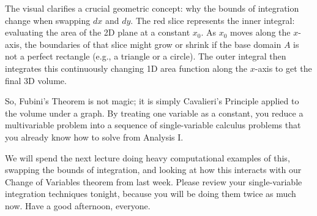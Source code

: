 \begin{math-stroke}
\begin{center}
\end{center}

\begin{explanation-of-steps}
The visual clarifies a crucial geometric concept: why the bounds of integration change when swapping $dx$ and $dy$. The red slice represents the inner integral: evaluating the area of the 2D plane at a constant $x_0$. As $x_0$ moves along the $x$-axis, the boundaries of that slice might grow or shrink if the base domain $A$ is not a perfect rectangle (e.g., a triangle or a circle). The outer integral then integrates this continuously changing 1D area function along the $x$-axis to get the final 3D volume.
\end{explanation-of-steps}
\end{math-stroke}

\begin{spoken-clean}[42:30 - 45:00]
So, Fubini's Theorem is not magic; it is simply Cavalieri's Principle applied to the volume under a graph. By treating one variable as a constant, you reduce a multivariable problem into a sequence of single-variable calculus problems that you already know how to solve from Analysis I. 

We will spend the next lecture doing heavy computational examples of this, swapping the bounds of integration, and looking at how this interacts with our Change of Variables theorem from last week. Please review your single-variable integration techniques tonight, because you will be doing them twice as much now. Have a good afternoon, everyone.
\end{spoken-clean}
